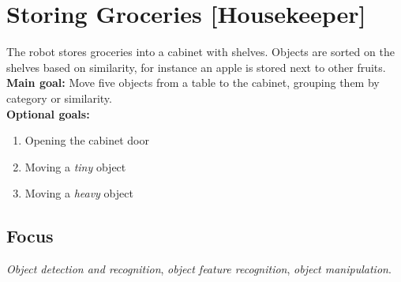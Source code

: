 \section{Storing Groceries [Housekeeper]}
\label{test:storing-groceries}
The robot stores groceries into a cabinet with shelves. Objects are sorted on the shelves based on similarity, for instance an apple is stored next to other fruits.\\

\noindent \textbf{Main goal:} Move five objects from a table to the cabinet, grouping them by category or similarity.\\

\noindent \textbf{Optional goals:}
\begin{enumerate}[nosep]
	\item Opening the cabinet door
	\item Moving a \emph{tiny} object
	\item Moving a \emph{heavy} object
\end{enumerate}

\subsection*{Focus}
\emph{Object detection and recognition}, \emph{object feature recognition}, \emph{object manipulation}.

